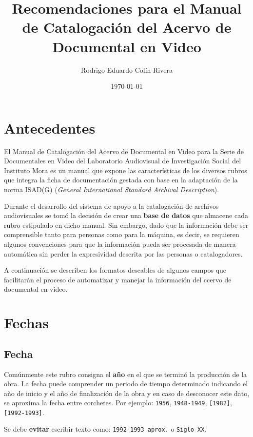 \documentclass[10pt,letterpaper]{article}
\begin{document}
\title{Recomendaciones para el Manual de Catalogación del Acervo de Documental en Video}
\author{Rodrigo Eduardo Colín Rivera}
\date{\today}
\maketitle

\setcounter{secnumdepth}{0} %
\setcounter{tocdepth}{0} %

\section{Antecedentes}
El Manual de Catalogación del Acervo de Documental en Video para la Serie de Documentales en Video del Laboratorio Audiovisual de Investigación Social del Instituto Mora es un manual que expone las características de los diversos rubros que integra la ficha de documentación gestada con base en la adaptación de la norma ISAD(G) (\textit{General International Standard Archival Description}).

Durante el desarrollo del sistema de apoyo a la catalogación de archivos audiovisuales se tomó la decisión de crear una \textbf{base de datos} que almacene cada rubro estipulado en dicho manual. Sin embargo, dado que la información debe ser comprensible tanto para personas como para la máquina, es decir, se requieren algunos convenciones para que la información pueda ser procesada de manera automática sin perder la expresividad descrita por las personas o catalogadores.

A continuación se describen los formatos deseables de algunos campos que facilitarán el proceso de automatizar y manejar la información del ccervo de documental en video.

\section{Fechas}

\subsection{Fecha}
Comúnmente este rubro consigna el \textbf{año} en el que se terminó la producción de la obra. La fecha puede comprender un periodo de tiempo determinado indicando el año de inicio y el año de finalización de la obra y en caso de desconocer este dato, se aproxima la fecha entre corchetes. Por ejemplo: \verb|1956|, \verb|1948-1949|, \verb|[1982]|, \verb|[1992-1993]|.

Se debe \textbf{evitar} escribir texto como: \verb|1992-1993 aprox.| o \verb|Siglo XX|.
\end{document}

